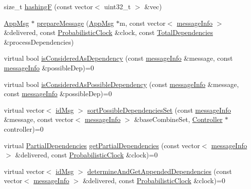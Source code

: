 \begin{DoxyCompactItemize}
\item 
size\+\_\+t \hyperlink{classHashErrorDetector_aa0b6a85ef4078e4851cd56b612a539c5}{hashingF} (const vector$<$ uint32\+\_\+t $>$ \&vec)
\item 
\hyperlink{classAppMsg}{App\+Msg} $\ast$ \hyperlink{classHashErrorDetector_a2b1dad6a83a08fd7ce88e32f84638459}{prepare\+Message} (\hyperlink{classAppMsg}{App\+Msg} $\ast$m, const vector$<$ \hyperlink{structures_8h_a7e7bdc1d2fff8a9436f2f352b2711ed6}{message\+Info} $>$ \&delivered, const \hyperlink{classProbabilisticClock}{Probabilistic\+Clock} \&clock, const \hyperlink{classTotalDependencies}{Total\+Dependencies} \&process\+Dependencies)
\item 
virtual bool \hyperlink{classHashErrorDetector_a4693d4d5e327b19f75088cef52bcad7d}{is\+Considered\+As\+Dependency} (const \hyperlink{structures_8h_a7e7bdc1d2fff8a9436f2f352b2711ed6}{message\+Info} \&message, const \hyperlink{structures_8h_a7e7bdc1d2fff8a9436f2f352b2711ed6}{message\+Info} \&possible\+Dep)=0
\item 
virtual bool \hyperlink{classHashErrorDetector_ac0a25b9c1e27f98223869d11ca46d18f}{is\+Considered\+As\+Possible\+Dependency} (const \hyperlink{structures_8h_a7e7bdc1d2fff8a9436f2f352b2711ed6}{message\+Info} \&message, const \hyperlink{structures_8h_a7e7bdc1d2fff8a9436f2f352b2711ed6}{message\+Info} \&possible\+Dep)=0
\item 
virtual vector$<$ \hyperlink{structures_8h_a83a1d9a070efa5341da84cfd8e28d3e5}{id\+Msg} $>$ \hyperlink{classHashErrorDetector_ad7419eaab728b7ed3e394d5aee9eda41}{sort\+Possible\+Dependencies\+Set} (const \hyperlink{structures_8h_a7e7bdc1d2fff8a9436f2f352b2711ed6}{message\+Info} \&message, const vector$<$ \hyperlink{structures_8h_a7e7bdc1d2fff8a9436f2f352b2711ed6}{message\+Info} $>$ \&base\+Combine\+Set, \hyperlink{classController}{Controller} $\ast$controller)=0
\item 
virtual \hyperlink{classPartialDependencies}{Partial\+Dependencies} \hyperlink{classHashErrorDetector_a5b9f7e8a6f63b1582e912102021c2d8d}{get\+Partial\+Dependencies} (const vector$<$ \hyperlink{structures_8h_a7e7bdc1d2fff8a9436f2f352b2711ed6}{message\+Info} $>$ \&delivered, const \hyperlink{classProbabilisticClock}{Probabilistic\+Clock} \&clock)=0
\item 
virtual vector$<$ \hyperlink{structures_8h_a83a1d9a070efa5341da84cfd8e28d3e5}{id\+Msg} $>$ \hyperlink{classHashErrorDetector_ae45353331e29b50a0aa2fc6dd540ed4e}{determine\+And\+Get\+Appended\+Dependencies} (const vector$<$ \hyperlink{structures_8h_a7e7bdc1d2fff8a9436f2f352b2711ed6}{message\+Info} $>$ \&delivered, const \hyperlink{classProbabilisticClock}{Probabilistic\+Clock} \&clock)=0
\end{DoxyCompactItemize}
